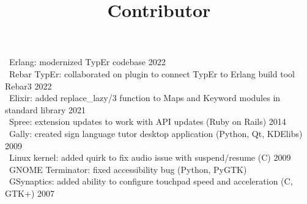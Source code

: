         \dates{}
        \location{}
        \title{Contributor}
        \begin{position}
           \textbullet \ Erlang: modernized TypEr codebase 2022\\
           \textbullet \ Rebar TypEr: collaborated on plugin to connect TypEr to Erlang build tool Rebar3 2022\\
           \textbullet \ Elixir: added replace\_lazy/3 function to Maps and Keyword modules in standard library 2021\\
            \textbullet \ Spree: extension updates to work with API updates (Ruby on Rails) 2014\\
            \textbullet \ Gally: created sign language tutor desktop application (Python, Qt, KDElibs) 2009\\
            \textbullet \ Linux kernel: added quirk to fix audio issue with suspend/resume (C) 2009\\
            \textbullet \ GNOME Terminator: fixed accessibility bug (Python, PyGTK)\\
            \textbullet \ GSynaptics: added ability to configure touchpad speed and acceleration (C, GTK+) 2007
        \end{position}
